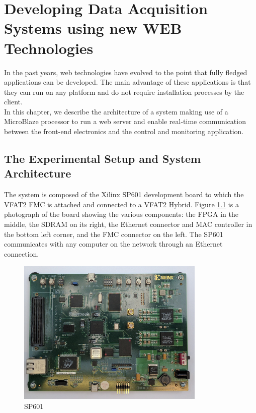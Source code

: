\chapter{Developing Data Acquisition Systems using new WEB Technologies}
\label{chap:III-2-web-daq}

  In the past years, web technologies have evolved to the point that fully fledged applications can be developed. The main advantage of these applications is that they can run on any platform and do not require installation processes by the client. \\

  In this chapter, we describe the architecture of a system making use of a MicroBlaze processor to run a web server and enable real-time communication between the front-end electronics and the control and monitoring application.

  \section{The Experimental Setup and System Architecture}

    The system is composed of the Xilinx SP601 development board to which the VFAT2 FMC is attached and connected to a VFAT2 Hybrid. Figure \ref{fig:III-2-sp601} is a photograph of the board showing the various components: the FPGA in the middle, the SDRAM on its right, the Ethernet connector and MAC controller in the bottom left corner, and the FMC connector on the left. The SP601 communicates with any computer on the network through an Ethernet connection. \\

    \begin{figure}[h!]
      \centering
      \includegraphics[width=0.8\textwidth]{img/III-2-web-daq/sp601.jpg}
      \caption{SP601}
      \label{fig:III-2-sp601}
    \end{figure}

